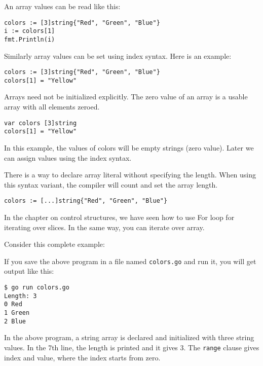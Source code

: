 An array values can be read like this:

\begin{lstlisting}[numbers=none]
colors := [3]string{"Red", "Green", "Blue"}
i := colors[1]
fmt.Println(i)
\end{lstlisting}

Similarly array values can be set using index syntax.  Here is an
example:

\begin{lstlisting}[numbers=none]
colors := [3]string{"Red", "Green", "Blue"}
colors[1] = "Yellow"
\end{lstlisting}

Arrays need not be initialized explicitly. The zero value of an
array is a usable array with all elements zeroed.

\begin{lstlisting}[numbers=none]
var colors [3]string
colors[1] = "Yellow"
\end{lstlisting}

In this example, the values of colors will be empty strings (zero
value).  Later we can assign values using the index syntax.

There is a way to declare array literal without specifying the length.
When using this syntax variant, the compiler will count and set the
array length.

\begin{lstlisting}[numbers=none]
colors := [...]string{"Red", "Green", "Blue"}
\end{lstlisting}

In the chapter on control structures, we have seen how to use For loop
for iterating over slices.  In the same way, you can iterate over
array.

Consider this complete example:



If you save the above program in a file named \texttt{colors.go} and
run it, you will get output like this:

\begin{lstlisting}[numbers=none]
$ go run colors.go
Length: 3
0 Red
1 Green
2 Blue
\end{lstlisting}

In the above program, a string array is declared and initialized with
three string values.  In the 7th line, the length is printed and it
gives 3. The \texttt{range} clause gives index and value, where the
index starts from zero.

